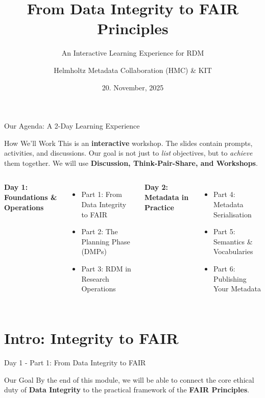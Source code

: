 \documentclass{integrity} %
\title{From Data Integrity to FAIR Principles}
\subtitle{An Interactive Learning Experience for RDM}
\author{Helmholtz Metadata Collaboration (HMC) \& KIT}
\institute{Research Data Management Training}
\date{20. November, 2025}
\begin{document}
\begin{frame}
    \titlepage
\end{frame}

\begin{frame}{Our Agenda: A 2-Day Learning Experience}
    \begin{block}{How We'll Work}
        This is an \textbf{interactive} workshop. The slides contain prompts, activities, and discussions. Our goal is not just to \emph{list} objectives, but to \emph{achieve} them together. We will use \textbf{Discussion, Think-Pair-Share, and Workshops}.
    \end{block}

    \begin{columns}
        \textbf{Day 1: Foundations \& Operations}
        \begin{itemize}
            \item Part 1: From Data Integrity to FAIR
            \item Part 2: The Planning Phase (DMPs)
            \item Part 3: RDM in Research Operations
        \end{itemize}
        
        \textbf{Day 2: Metadata in Practice}
        \begin{itemize}
            \item Part 4: Metadata Serialisation
            \item Part 5: Semantics \& Vocabularies
            \item Part 6: Publishing Your Metadata
        \end{itemize}
    \end{columns}
\end{frame}

\section{Intro: Integrity to FAIR}

\begin{frame}{Day 1 - Part 1: From Data Integrity to FAIR}
    \begin{block}{Our Goal}
        By the end of this module, we will be able to connect the core ethical duty of \textbf{Data Integrity} to the practical framework of the \textbf{FAIR Principles}.
    \end{block}
\end{frame}
\end{document}
